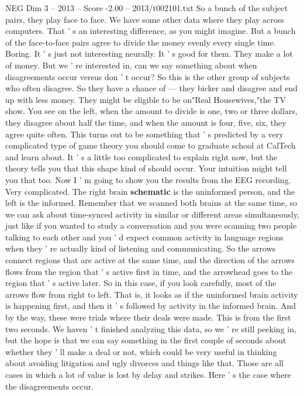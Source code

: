 \begin{textsample}{NEG Dim 3 – 2013 – Score -2.00 – 2013/t002101.txt}
So a bunch of the subject pairs, they play face to face.
We have some other data where they play across computers.
That ' s an interesting difference, as you might imagine.
But a bunch of the face-to-face pairs agree to divide the money evenly every single time.
Boring.
It ' s just not interesting neurally.
It ' s good for them.
They make a lot of money.
But we ' re interested in, can we say something about when disagreements occur versus don ' t occur?
So this is the other group of subjects who often disagree.
So they have a chance of — they bicker and disagree and end up with less money.
They might be eligible to be on"Real Housewives,"the TV show.
You see on the left, when the amount to divide is one, two or three dollars, they disagree about half the time, and when the amount is four, five, six, they agree quite often.
This turns out to be something that ' s predicted by a very complicated type of game theory you should come to graduate school at CalTech and learn about.
It ' s a little too complicated to explain right now, but the theory tells you that this shape kind of should occur.
Your intuition might tell you that too.
Now I ' m going to show you the results from the EEG recording.
Very complicated.
The right brain \textbf{schematic} is the uninformed person, and the left is the informed.
Remember that we scanned both brains at the same time, so we can ask about time-synced activity in similar or different areas simultaneously, just like if you wanted to study a conversation and you were scanning two people talking to each other and you ' d expect common activity in language regions when they ' re actually kind of listening and communicating.
So the arrows connect regions that are active at the same time, and the direction of the arrows flows from the region that ' s active first in time, and the arrowhead goes to the region that ' s active later.
So in this case, if you look carefully, most of the arrows flow from right to left.
That is, it looks as if the uninformed brain activity is happening first, and then it ' s followed by activity in the informed brain.
And by the way, these were trials where their deals were made.
This is from the first two seconds.
We haven ' t finished analyzing this data, so we ' re still peeking in, but the hope is that we can say something in the first couple of seconds about whether they ' ll make a deal or not, which could be very useful in thinking about avoiding litigation and ugly divorces and things like that.
Those are all cases in which a lot of value is lost by delay and strikes.
Here ' s the case where the disagreements occur.

\end{textsample}
